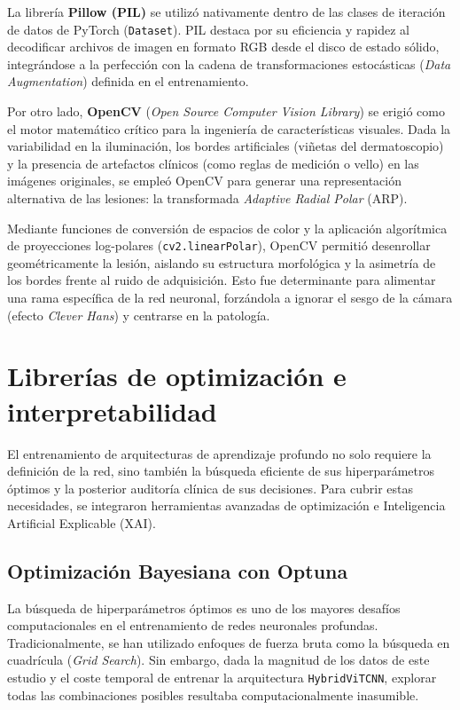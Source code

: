 La librería \textbf{Pillow (PIL)} se utilizó nativamente dentro de las clases de iteración de datos de PyTorch (\texttt{Dataset}). PIL destaca por su eficiencia y rapidez al decodificar archivos de imagen en formato RGB desde el disco de estado sólido, integrándose a la perfección con la cadena de transformaciones estocásticas (\textit{Data Augmentation}) definida en el entrenamiento.

Por otro lado, \textbf{OpenCV} (\textit{Open Source Computer Vision Library}) se erigió como el motor matemático crítico para la ingeniería de características visuales. Dada la variabilidad en la iluminación, los bordes artificiales (viñetas del dermatoscopio) y la presencia de artefactos clínicos (como reglas de medición o vello) en las imágenes originales, se empleó OpenCV para generar una representación alternativa de las lesiones: la transformada \textit{Adaptive Radial Polar} (ARP). 

Mediante funciones de conversión de espacios de color y la aplicación algorítmica de proyecciones log-polares (\texttt{cv2.linearPolar}), OpenCV permitió desenrollar geométricamente la lesión, aislando su estructura morfológica y la asimetría de los bordes frente al ruido de adquisición. Esto fue determinante para alimentar una rama específica de la red neuronal, forzándola a ignorar el sesgo de la cámara (efecto \textit{Clever Hans}) y centrarse en la patología.

\section{Librerías de optimización e interpretabilidad}

El entrenamiento de arquitecturas de aprendizaje profundo no solo requiere la definición de la red, sino también la búsqueda eficiente de sus hiperparámetros óptimos y la posterior auditoría clínica de sus decisiones. Para cubrir estas necesidades, se integraron herramientas avanzadas de optimización e Inteligencia Artificial Explicable (XAI).

\subsection{Optimización Bayesiana con Optuna}

La búsqueda de hiperparámetros óptimos es uno de los mayores desafíos computacionales en el entrenamiento de redes neuronales profundas. Tradicionalmente, se han utilizado enfoques de fuerza bruta como la búsqueda en cuadrícula (\textit{Grid Search}). Sin embargo, dada la magnitud de los datos de este estudio y el coste temporal de entrenar la arquitectura \texttt{HybridViTCNN}, explorar todas las combinaciones posibles resultaba computacionalmente inasumible.

